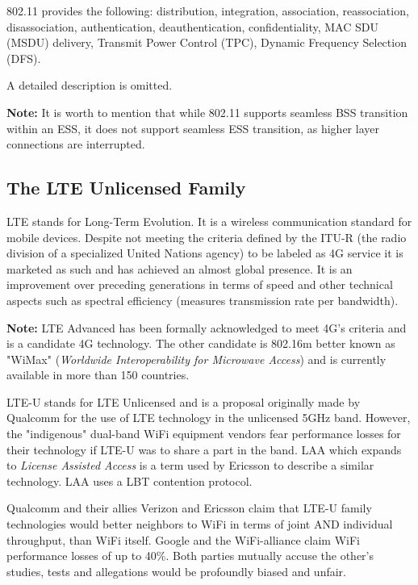 \documentclass{article}
\begin{document}
	\bigskip
	
	802.11 provides the following: distribution, integration, association, reassociation, disassociation, authentication, deauthentication, confidentiality, MAC SDU (MSDU) delivery, Transmit Power Control (TPC), Dynamic Frequency Selection (DFS).
	
	\smallskip
	
	A detailed description is omitted.
	
	\bigskip
	
	\textbf{Note:} It is worth to mention that while 802.11 supports seamless BSS transition within an ESS, it does not support seamless ESS transition, as higher layer connections are interrupted.
	
	\subsection{The LTE Unlicensed Family}

	LTE stands for Long-Term Evolution. It is a wireless communication standard for mobile devices. Despite not meeting the criteria defined by the ITU-R (the radio division of a specialized United Nations agency) to be labeled as 4G service it is marketed as such and has achieved an almost global presence. It is an improvement over preceding generations in terms of speed and other technical aspects such as spectral efficiency (measures transmission rate per bandwidth).
	
	\medskip
	
	\textbf{Note:} LTE Advanced has been formally acknowledged to meet 4G's criteria and is a candidate 4G technology. The other candidate is 802.16m better known as "WiMax" (\emph{Worldwide Interoperability for Microwave Access}) and is currently available in more than 150 countries.
	
	\bigskip
	
	LTE-U stands for LTE Unlicensed and is a proposal originally made by Qualcomm for the use of LTE technology in the unlicensed 5GHz band. However, the "indigenous" dual-band WiFi equipment vendors fear performance losses for their technology if LTE-U was to share a part in the band. LAA which expands to \emph{License Assisted Access} is a term used by Ericsson to describe a similar technology. LAA uses a LBT contention protocol. 
	
	\bigskip
	
	Qualcomm and their allies Verizon and Ericsson claim that LTE-U family technologies would better neighbors to WiFi in terms of joint AND individual throughput, than WiFi itself. Google and the WiFi-alliance claim WiFi performance losses of up to 40\%. Both parties mutually accuse the other's studies, tests and allegations would be profoundly biased and unfair.
	
\end{document}
